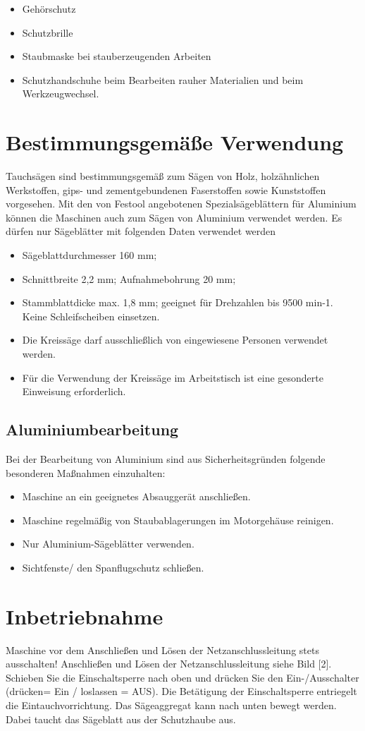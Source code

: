 \documentclass{\basedir/fablab-document}
\begin{document}
\begin{itemize}
\item Gehörschutz
\item Schutzbrille
\item Staubmaske bei stauberzeugenden Arbeiten 
\item Schutzhandschuhe beim Bearbeiten rauher Materialien und beim Werkzeugwechsel.
\end{itemize}

\section{Bestimmungsgemäße Verwendung}
Tauchsägen sind bestimmungsgemäß zum Sägen von Holz, holzähnlichen Werkstoffen, gips- und zementgebundenen Faserstoffen sowie Kunststoffen vorgesehen. Mit den von Festool angebotenen Spezialsägeblättern für Aluminium können die Maschinen auch zum Sägen von Aluminium verwendet werden. Es dürfen nur Sägeblätter mit folgenden Daten verwendet werden
\begin{itemize}
\item Sägeblattdurchmesser 160 mm;
\item Schnittbreite 2,2 mm; Aufnahmebohrung 20 mm;
\item Stammblattdicke max. 1,8 mm; geeignet für Drehzahlen bis 9500 min-1. Keine Schleifscheiben einsetzen.
\item Die Kreissäge darf ausschließlich von eingewiesene Personen verwendet werden.
\item Für die Verwendung der Kreissäge im Arbeitstisch ist eine gesonderte Einweisung erforderlich.
\end{itemize}

\subsection{Aluminiumbearbeitung}
Bei der Bearbeitung von Aluminium sind aus Sicherheitsgründen folgende besonderen Maßnahmen einzuhalten:
\begin{itemize}
\item Maschine an ein geeignetes Absauggerät anschließen.
\item Maschine regelmäßig von Staubablagerungen im Motorgehäuse reinigen.
\item Nur Aluminium-Sägeblätter verwenden.
\item Sichtfenste/ den Spanflugschutz schließen.
\end{itemize}


\section{Inbetriebnahme}
Maschine vor dem Anschließen und Lösen der Netzanschlussleitung stets ausschalten! Anschließen und Lösen der Netzanschlussleitung siehe Bild [2].
Schieben Sie die Einschaltsperre nach oben und drücken Sie den Ein-/Ausschalter (drücken= Ein / loslassen = AUS).
Die Betätigung der Einschaltsperre entriegelt die Eintauchvorrichtung. Das Sägeaggregat kann nach unten bewegt werden. Dabei taucht das Sägeblatt aus der Schutzhaube aus.
\end{document}
